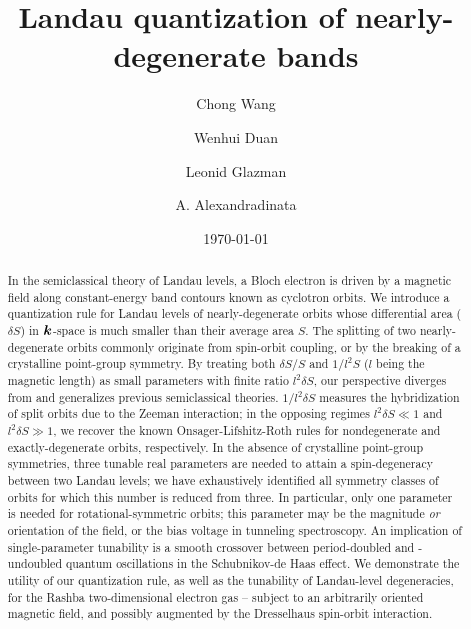 \documentclass[aps, prb, showpacs, twocolumn, notitlepage, superscriptaddress]{revtex4-1}
\begin{document}
\title{Landau quantization of nearly-degenerate bands}

\author{Chong Wang}
\author{Wenhui Duan}
\author{Leonid Glazman}
\author{A. Alexandradinata}

\begin{abstract}
In the semiclassical theory of Landau levels, a Bloch electron is driven by a magnetic field  along constant-energy band contours  known as cyclotron orbits. We introduce a quantization rule for Landau levels of nearly-degenerate orbits whose differential area ($\delta S$) in $\boldsymbol{k}$-space is much smaller than their average area $S$. The splitting of two nearly-degenerate orbits commonly originate from spin-orbit coupling, or by the breaking of a crystalline point-group symmetry. By treating both $\delta S/S$ and $1/l^2S$ ($l$ being the magnetic length) as small parameters with finite ratio $l^2\delta S$, our perspective diverges from and generalizes previous semiclassical theories.  $1/l^2\delta S$ measures the hybridization of split orbits due to the Zeeman interaction; in the opposing regimes $l^2\delta S {{\ll}} 1$  and $l^2\delta S{\gg}1$, we recover the known Onsager-Lifshitz-Roth rules for nondegenerate and exactly-degenerate orbits, respectively.  In the absence of crystalline point-group symmetries, three tunable real parameters are needed to attain a spin-degeneracy between two Landau levels; we have exhaustively identified all symmetry classes of orbits for which this number is reduced from three. In particular, only one parameter is needed for rotational-symmetric orbits; this parameter may be the magnitude \textit{or} orientation of the field, or the bias voltage in tunneling spectroscopy. An implication of single-parameter tunability is a smooth crossover between period-doubled and -undoubled quantum oscillations in the Schubnikov-de Haas effect. We demonstrate the utility of our quantization rule, as well as the tunability of Landau-level degeneracies, for the Rashba two-dimensional electron gas -- subject to an arbitrarily oriented magnetic field, and possibly augmented by the Dresselhaus spin-orbit interaction.
\end{abstract}
\date{\today}
\end{document}
